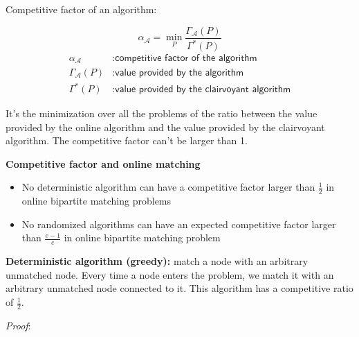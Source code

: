 \documentclass[10pt,a4paper]{article}
\begin{document}
Competitive factor of an algorithm:

$$\alpha_{\mathscr{A}} = \min_{P} \frac{\Gamma_{\mathscr{A}}(P)}{\Gamma^*(P)}$$
$$\begin{aligned}\alpha_{\mathscr{A}} &: \textsf{competitive factor of the algorithm}\\
\Gamma_{\mathscr{A}}(P) &: \textsf{value provided by the algorithm}\\ \Gamma^*(P) &: \textsf{value provided by the clairvoyant algorithm}\end{aligned}$$

It's the minimization over all the problems of the ratio between the value provided by the online algorithm and the value provided by the clairvoyant algorithm. The competitive factor can't be larger than 1.
\newline

\textbf{Competitive factor and online matching}

\begin{itemize}

\item No deterministic algorithm can have a competitive factor larger than $\frac{1}{2}$ in online bipartite matching problems
\item No randomized algorithms can have an expected competitive factor larger than $\frac{e-1}{e}$ in online bipartite matching problem
\end{itemize}

\textbf{Deterministic algorithm (greedy):} match a node with an arbitrary unmatched node. Every time a node enters the problem, we match it with an arbitrary unmatched node connected to it. This algorithm has a competitive ratio of $\frac{1}{2}$.
\newline

\textit{Proof}:
\end{document}

